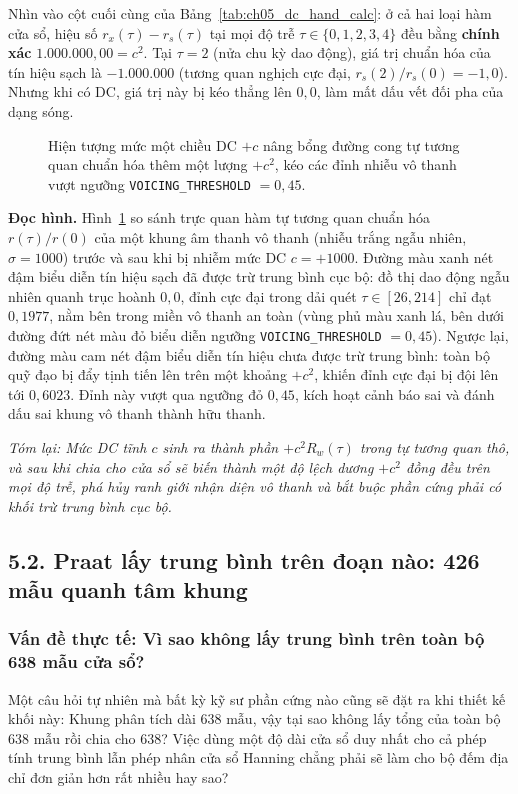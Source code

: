 Nhìn vào cột cuối cùng của Bảng~\ref{tab:ch05_dc_hand_calc}: ở cả hai loại hàm cửa sổ, hiệu số $r_x(\tau) - r_s(\tau)$ tại mọi độ trễ $\tau \in \{0, 1, 2, 3, 4\}$ đều bằng \textbf{chính xác} $1.000.000{,}00 = c^2$. Tại $\tau = 2$ (nửa chu kỳ dao động), giá trị chuẩn hóa của tín hiệu sạch là $-1.000.000$ (tương quan nghịch cực đại, $r_s(2)/r_s(0) = -1{,}0$). Nhưng khi có DC, giá trị này bị kéo thẳng lên $0{,}0$, làm mất dấu vết đối pha của dạng sóng.

\begin{figure}[H]
\centering

\caption{Hiện tượng mức một chiều DC $+c$ nâng bổng đường cong tự tương quan chuẩn hóa thêm một lượng $+c^2$, kéo các đỉnh nhiễu vô thanh vượt ngưỡng \texttt{VOICING\_THRESHOLD} $= 0{,}45$.}
\label{fig:ch05_dc_effect}
\end{figure}

\textbf{Đọc hình.} Hình~\ref{fig:ch05_dc_effect} so sánh trực quan hàm tự tương quan chuẩn hóa $r(\tau)/r(0)$ của một khung âm thanh vô thanh (nhiễu trắng ngẫu nhiên, $\sigma = 1000$) trước và sau khi bị nhiễm mức DC $c = +1000$. Đường màu xanh nét đậm biểu diễn tín hiệu sạch đã được trừ trung bình cục bộ: đồ thị dao động ngẫu nhiên quanh trục hoành $0{,}0$, đỉnh cực đại trong dải quét $\tau \in [26, 214]$ chỉ đạt $0{,}1977$, nằm bên trong miền vô thanh an toàn (vùng phủ màu xanh lá, bên dưới đường đứt nét màu đỏ biểu diễn ngưỡng \texttt{VOICING\_THRESHOLD} $= 0{,}45$). Ngược lại, đường màu cam nét đậm biểu diễn tín hiệu chưa được trừ trung bình: toàn bộ quỹ đạo bị đẩy tịnh tiến lên trên một khoảng $+c^2$, khiến đỉnh cực đại bị đội lên tới $0{,}6023$. Đỉnh này vượt qua ngưỡng đỏ $0{,}45$, kích hoạt cảnh báo sai và đánh dấu sai khung vô thanh thành hữu thanh.

\textit{Tóm lại: Mức DC tĩnh $c$ sinh ra thành phần $+c^2 R_w(\tau)$ trong tự tương quan thô, và sau khi chia cho cửa sổ sẽ biến thành một độ lệch dương $+c^2$ đồng đều trên mọi độ trễ, phá hủy ranh giới nhận diện vô thanh và bắt buộc phần cứng phải có khối trừ trung bình cục bộ.}

\subsection*{5.2. Praat lấy trung bình trên đoạn nào: 426 mẫu quanh tâm khung}

\subsubsection*{Vấn đề thực tế: Vì sao không lấy trung bình trên toàn bộ 638 mẫu cửa sổ?}
Một câu hỏi tự nhiên mà bất kỳ kỹ sư phần cứng nào cũng sẽ đặt ra khi thiết kế khối này: Khung phân tích dài $638\text{ mẫu}$, vậy tại sao không lấy tổng của toàn bộ $638\text{ mẫu}$ rồi chia cho $638$? Việc dùng một độ dài cửa sổ duy nhất cho cả phép tính trung bình lẫn phép nhân cửa sổ Hanning chẳng phải sẽ làm cho bộ đếm địa chỉ đơn giản hơn rất nhiều hay sao?

